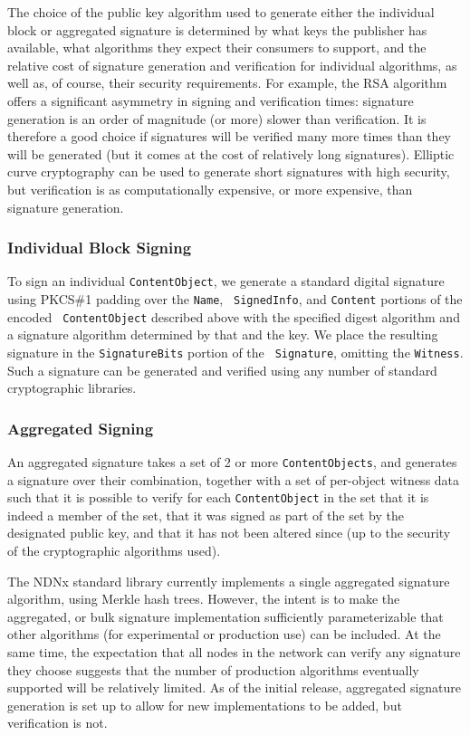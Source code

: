 The choice of the public key algorithm used to generate either the
individual block or aggregated signature is determined by what keys
the publisher has available, what algorithms they expect their
consumers to support, and the relative cost of signature generation
and verification for individual algorithms, as well as, of course,
their security requirements. For example, the RSA algorithm offers a
significant asymmetry in signing and verification times: signature
generation is an order of magnitude (or more) slower than
verification. It is therefore a good choice if signatures will be
verified many more times than they will be generated (but it comes at
the cost of relatively long signatures). Elliptic curve cryptography
can be used to generate short signatures with high security, but
verification is as computationally expensive, or more expensive, than
signature generation.


\subsubsection{Individual Block Signing}

To sign an individual {\tt ContentObject}, we generate a standard
digital signature using PKCS\#1 padding over the {\tt Name}, {\tt
  SignedInfo}, and {\tt Content} portions of the encoded {\tt
  ContentObject} described above with the specified digest algorithm
and a signature algorithm determined by that and the key. We place the
resulting signature in the {\tt SignatureBits} portion of the {\tt
  Signature}, omitting the {\tt Witness}. Such a signature can be
generated and verified using any number of standard cryptographic
libraries.


\subsubsection{Aggregated Signing}

An aggregated signature takes a set of 2 or more {\tt ContentObjects},
and generates a signature over their combination, together with a set
of per-object witness data such that it is possible to verify for each
{\tt ContentObject} in the set that it is indeed a member of the set,
that it was signed as part of the set by the designated public key,
and that it has not been altered since (up to the security of the
cryptographic algorithms used).

The NDNx standard library currently implements a single aggregated
signature algorithm, using Merkle hash trees. However, the intent is
to make the aggregated, or bulk signature implementation sufficiently
parameterizable that other algorithms (for experimental or production
use) can be included. At the same time, the expectation that all nodes
in the network can verify any signature they choose suggests that the
number of production algorithms eventually supported will be
relatively limited. As of the initial release, aggregated signature
generation is set up to allow for new implementations to be added, but
verification is not.

